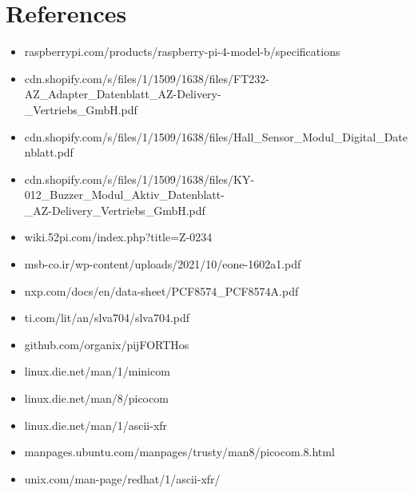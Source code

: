 \documentclass[]{article}
\begin{document}
\newpage

\section{References}

\begin{itemize}
    \item raspberrypi.com/products/raspberry-pi-4-model-b/specifications
    \item cdn.shopify.com/s/files/1/1509/1638/files/FT232-AZ\_Adapter\_Datenblatt\_AZ-Delivery-
    \\\_Vertriebs\_GmbH.pdf
    \item cdn.shopify.com/s/files/1/1509/1638/files/Hall\_Sensor\_Modul\_Digital\_Datenblatt.pdf
    \item cdn.shopify.com/s/files/1/1509/1638/files/KY-012\_Buzzer\_Modul\_Aktiv\_Datenblatt-
    \\\_AZ-Delivery\_Vertriebs\_GmbH.pdf
    \item wiki.52pi.com/index.php?title=Z-0234
    \item msb-co.ir/wp-content/uploads/2021/10/eone-1602a1.pdf
    \item nxp.com/docs/en/data-sheet/PCF8574\_PCF8574A.pdf
    \item ti.com/lit/an/slva704/slva704.pdf
    \item github.com/organix/pijFORTHos
    \item linux.die.net/man/1/minicom
    \item linux.die.net/man/8/picocom
    \item linux.die.net/man/1/ascii-xfr
    \item manpages.ubuntu.com/manpages/trusty/man8/picocom.8.html
    \item unix.com/man-page/redhat/1/ascii-xfr/
\end{itemize}
\end{document}
